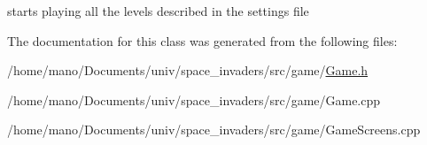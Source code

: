 starts playing all the levels described in the settings file 

The documentation for this class was generated from the following files\+:\begin{DoxyCompactItemize}
\item 
/home/mano/\+Documents/univ/space\+\_\+invaders/src/game/\hyperlink{Game_8h}{Game.\+h}\item 
/home/mano/\+Documents/univ/space\+\_\+invaders/src/game/Game.\+cpp\item 
/home/mano/\+Documents/univ/space\+\_\+invaders/src/game/Game\+Screens.\+cpp\end{DoxyCompactItemize}
